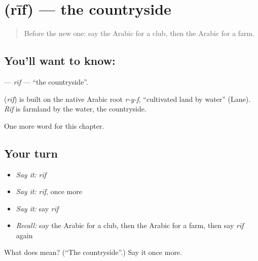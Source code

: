 \section[\texorpdfstring{\ar{ريف} (rīf)}{ريف (rīf)}]{ (rīf) — the countryside}

\label{lesson:AR-C265-rif}



\begin{quote}
Before the new one: say the Arabic for a club, then the Arabic for a farm.
\end{quote}

\subsection*{You'll want to know: }
\textbf{} — \emph{rīf} — \textquotedblleft{}the countryside\textquotedblright{}.

\begin{cousinweb}
\textbf{} (\emph{rīf}) is built on the native Arabic root \emph{r-y-f}, \textquotedblleft{}cultivated land by water\textquotedblright{} (Lane). \emph{Rīf} is farmland by the water, the countryside.
\end{cousinweb}

\begin{grammarlens}[title={What you've built}]
One more word for this chapter.
\end{grammarlens}

\subsection*{Your turn}
\begin{itemize}
\raggedright
  \item \emph{Say it:} \emph{rīf}
  \item \emph{Say it:} \emph{rīf}, once more
  \item \emph{Say it:} say \emph{rīf}
  \item \emph{Recall:} say the Arabic for a club, then the Arabic for a farm, then say \emph{rīf} again
\end{itemize}

\begin{tcolorbox}[breakable,colback=teal!4,colframe=teal!35!black,title={Before you move on}]
What does  mean? (\textquotedblleft{}The countryside\textquotedblright{}.) Say it once more.
\end{tcolorbox}

